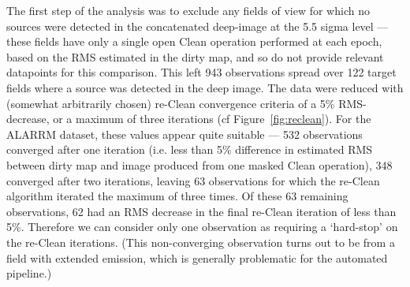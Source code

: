 \documentclass[5p,authoryear]{elsarticle}
\begin{document}
The first step of the analysis was to exclude any fields of view for which no sources were detected in the concatenated deep-image at the 5.5 sigma level --- these fields have only a single open Clean operation performed at each epoch, based on the RMS estimated in the dirty map, and so do not provide relevant datapoints for this comparison.
This left 943 observations spread over 122 target fields where a source was detected in the deep image.
The data were reduced with (somewhat arbitrarily chosen) re-Clean convergence criteria of a 5\% RMS-decrease, or a maximum of three iterations (cf Figure~\ref{fig:reclean}). 
For the ALARRM dataset, these values appear quite suitable --- 532 observations converged after one iteration (i.e. less than 5\% difference in estimated RMS between dirty map and image produced from one masked Clean operation), 348 converged after two iterations, leaving 63 observations for which the re-Clean algorithm iterated the maximum of three times. 
Of these 63 remaining observations, 62 had an RMS decrease in the final re-Clean iteration of less than 5\%. Therefore we can consider only one observation as requiring a `hard-stop' on the re-Clean iterations. 
(This non-converging observation turns out to be from a field with extended emission, which is generally problematic for the automated pipeline.)
\end{document}
